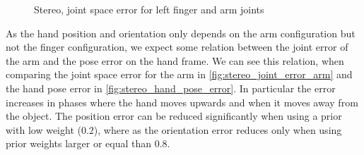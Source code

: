 \begin{figure}
\centering
{}
%
\caption{Stereo, joint space error for left finger and arm joints}
\label{fig:stereo_joint_error}
\end{figure}

As the hand position and orientation only depends on the arm configuration but not the finger configuration, we expect some relation between the joint error of the arm and the pose error on the hand frame. We can see this relation, when comparing the joint space error for the arm in \cref{fig:stereo_joint_error_arm} and the hand pose error in \cref{fig:stereo_hand_pose_error}. In particular the error increases in phases where the hand moves upwards and when it moves away from the object. The position error can be reduced significantly when using a prior with low weight ($0.2$), where as the orientation error reduces only when using prior weights larger or equal than $0.8$.

